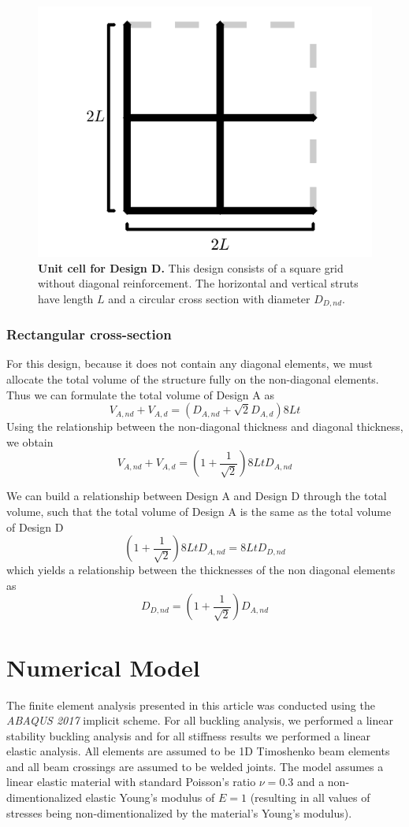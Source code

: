 \documentclass[10pt,twoside]{fernandes_supp}
\begin{document}
\begin{figure}[H]
    \centering
    \includegraphics[width=0.4\linewidth]{SFig5.png}
    \caption{{\bf Unit cell for Design D.} This design consists of a square grid without diagonal reinforcement.  The horizontal and vertical struts have length $L$ and a circular cross section with diameter $D_{D,nd}$.}
    \label{DesignD}
\end{figure}

\subsubsection{Rectangular cross-section}
For this design, because it does not contain any diagonal elements, we must allocate the total volume of the structure fully on the non-diagonal elements. Thus we can formulate the total volume of Design A as
\begin{equation}
	V_{A,nd}+V_{A,d}=(D_{A,nd}+\sqrt{2}D_{A,d})8Lt
\end{equation}
Using the relationship between the non-diagonal thickness and diagonal thickness, we obtain
\begin{equation}
V_{A,nd}+V_{A,d}=\left(1+\frac{1}{\sqrt{2}}\right)8LtD_{A,nd}
\end{equation}

We can build a relationship between Design A and Design D through the total volume, such that the total volume of Design A is the same as the total volume of Design D
\begin{equation}
\left(1+\frac{1}{\sqrt{2}}\right)8LtD_{A,nd}=8LtD_{D,nd}
\end{equation}
which yields a relationship between the thicknesses of the non diagonal elements as
\begin{equation}
	D_{D,nd}=\left(1+\frac{1}{\sqrt{2}}\right)D_{A,nd}
\end{equation}

\section{Numerical Model}
The finite element analysis presented in this article was conducted using the {\it ABAQUS 2017} implicit scheme. For all buckling analysis, we performed a linear stability buckling analysis and for all stiffness results we performed a linear elastic analysis. All elements are assumed to be 1D Timoshenko beam elements and all beam crossings are assumed to be welded joints. The model assumes a linear elastic material with standard Poisson's ratio $\nu=0.3$ and a non-dimentionalized elastic Young's modulus of $E=1$ (resulting in all values of stresses being non-dimentionalized by the material's Young's modulus).
\end{document}
